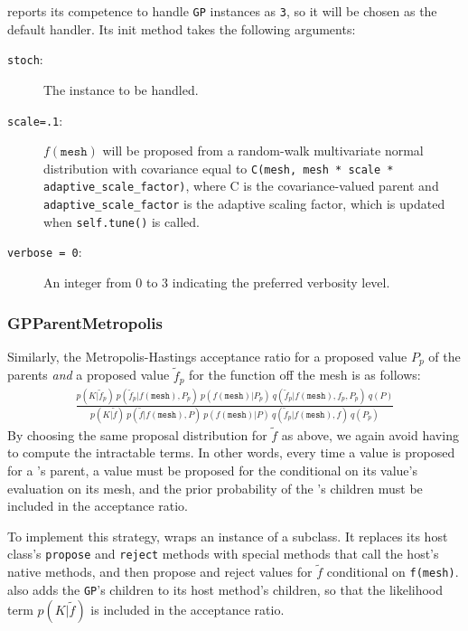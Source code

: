 \documentclass[]{manual}
\begin{document}
 reports its competence to handle \texttt{GP} instances as \texttt{3}, so it will be chosen as the default handler. Its init method takes the following arguments:
\begin{description}
    \item[\texttt{stoch}:] The  instance to be handled.
    \item[\texttt{scale=.1}:] $f(\texttt{mesh})$ will be proposed from a random-walk multivariate normal distribution with covariance equal to \texttt{C(mesh, mesh * scale * adaptive_scale_factor)}, where C is the covariance-valued parent and \texttt{adaptive_scale_factor} is the adaptive scaling factor, which is updated when \texttt{self.tune()} is called.
    \item[\texttt{verbose = 0}:] An integer from 0 to 3 indicating the preferred verbosity level.
\end{description}

\subsubsection{GPParentMetropolis}
Similarly, the Metropolis-Hastings acceptance ratio for a proposed value $P_p$ of the parents \emph{and} a proposed value $\tilde f_p$ for the function off the mesh is as follows:
\begin{eqnarray*}
    \frac{p(K|\tilde f_p)\ p(\tilde f_p|f(\texttt{mesh}), P_p)\ p(f(\texttt{mesh}) | P_p)\ q(\tilde f_p|f(\texttt{mesh}),f_p, P_p)\ q(P)}{p(K|\tilde f)\ p(\tilde f|f(\texttt{mesh}), P)\ p(f(\texttt{mesh}) | P)\ q(\tilde f_p|f(\texttt{mesh}),f)\ q(P_p)}
\end{eqnarray*}
By choosing the same proposal distribution for $\tilde f$ as above, we again avoid having to compute the intractable terms. In other words, every time a value is proposed for a 's parent, a value must be proposed for the   conditional on its value's evaluation on its mesh, and the prior probability of the 's children must be included in the acceptance ratio.

To implement this strategy,  wraps an instance of a  subclass. It replaces its host class's \texttt{propose} and \texttt{reject} methods with special methods that call the host's native methods, and then propose and reject values for $\tilde f$ conditional on \texttt{f(mesh)}.  also adds the \texttt{GP}'s children to its host method's children, so that the likelihood term $p(K|\tilde f)$ is included in the acceptance ratio.
\end{document}
